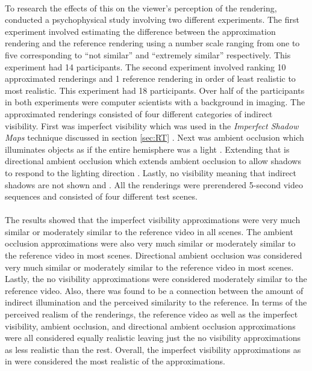 \paragraph{}
To research the effects of this on the viewer's perception of the rendering, \cite{Yu2009} conducted a psychophysical study involving two different experiments.  The first experiment involved estimating the difference between the approximation rendering and the reference rendering using a number scale ranging from one to five corresponding to “not similar” and “extremely similar” respectively.  This experiment had 14 participants.  The second experiment involved ranking 10 approximated renderings and 1 reference rendering in order of least realistic to most realistic.  This experiment had 18 participants.  Over half of the participants in both experiments were computer  scientists with a background in imaging.  The approximated renderings consisted of four different categories of indirect visibility.  First was imperfect visibility which was used in the \textit{Imperfect Shadow Maps} technique discussed in section \ref{sec:RT} \cite{Ritschel2008}.  Next was ambient occlusion which illuminates objects as if the entire hemisphere was a light \cite{Zhukov1998}. Extending that is directional ambient occlusion which extends ambient occlusion to allow shadows to respond to the lighting direction \cite{Sloan2007} \cite{Ritschel2009}.  Lastly, no visibility meaning that indirect shadows are not shown \cite{Dachsbacher2005} and \cite{Dachsbacher2006}.  All the renderings were prerendered 5-second video sequences and consisted of four different test scenes.

\paragraph{}
The results showed that the imperfect visibility approximations were very much similar or moderately similar to the reference video in all scenes.  The ambient occlusion approximations were also very much similar or moderately similar to the reference video in most scenes.  Directional ambient occlusion was considered very much similar or moderately similar to the reference video in most scenes.  Lastly, the no visibility approximations were considered moderately similar to the reference video.  Also, there was found to be a connection between the amount of indirect illumination and the perceived similarity to the reference.  In terms of the perceived realism of the renderings, the reference video as well as the imperfect visibility, ambient occlusion, and directional ambient occlusion approximations were all considered equally realistic leaving just the no visibility approximations as less realistic than the rest.  Overall, the imperfect visibility approximations as in \cite{Ritschel2008} were considered the most realistic of the approximations.


